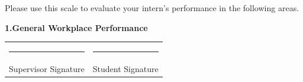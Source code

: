 \documentclass[
  12pt,
  a4paperpaper,
]{report}
\begin{document}
\begin{center}
\begin{minipage}{\textwidth}
\vspace{0.25cm}

{\small Please use this scale to evaluate your intern's performance in the following areas.}

\vspace{0.2cm}

\noindent\textbf{1.\quad General Workplace Performance}

\vspace{0.2cm}
\vspace{1.5cm}
\noindent\begin{tabularx}{\textwidth}{@{}X X@{}}
\rule{6cm}{0.4pt} & \rule{6cm}{0.4pt} \\
Supervisor Signature & Student Signature \\
\end{tabularx}
\vspace*{1cm}

\end{minipage}
\end{center}

\clearpage
\end{document}
